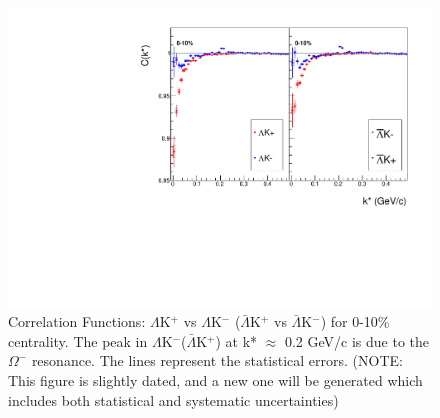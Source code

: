 \documentclass[../AnalysisNoteJBuxton.tex]{subfiles}
\begin{document}
\begin{figure}[h]
  \centering
  \includegraphics[width=\textwidth]{4_CorrelationFunctions/Figures/canLamKchPvsLamKchM0010.pdf}
  \caption[Correlation Functions: $\Lambda$K$^{+}$ vs $\Lambda$K$^{-}$ for 0-10\% Centrality]{Correlation Functions: $\Lambda$K$^{+}$ vs $\Lambda$K$^{-}$ ($\bar{\Lambda}$K$^{+}$ vs $\bar{\Lambda}$K$^{-}$) for 0-10\% centrality.  The peak in $\Lambda$K$^{-}$($\bar{\Lambda}$K$^{+}$) at k* $\approx$ 0.2 GeV/c is due to the $\Omega^{-}$ resonance.  The lines represent the statistical errors. (NOTE: This figure is slightly dated, and a new one will be generated which includes both statistical and systematic uncertainties)}
  \label{fig:cLamcKchCfs0010}
\end{figure}
\end{document}
